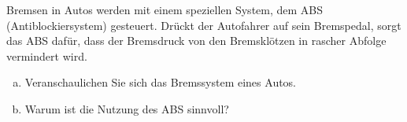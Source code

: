 %
\begin{aufgabe}
	Bremsen in Autos werden mit einem speziellen System, dem  ABS (Antiblockiersystem) gesteuert.
	Drückt der Autofahrer auf sein Bremspedal, sorgt das ABS dafür, dass der Bremsdruck von den Bremsklötzen in rascher Abfolge
	vermindert wird.
	\begin{enumerate} [a)]
		\item Veranschaulichen Sie sich das Bremssystem eines Autos.
		\item Warum ist die Nutzung des ABS sinnvoll?
	\end{enumerate}
\end{aufgabe}
\begin{loesung}

\end{loesung}
